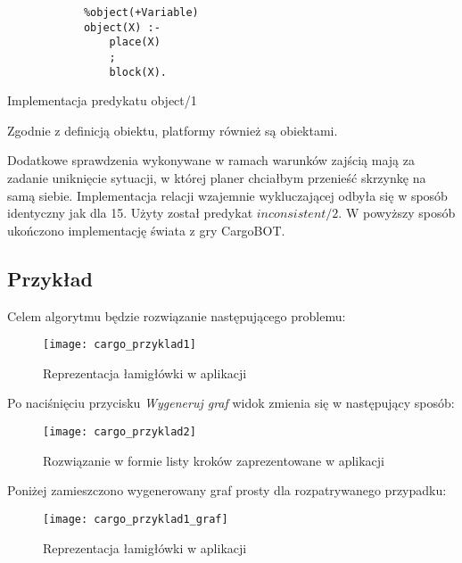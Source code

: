    \begin{listing}[H]
        \begin{verbatim}
            %object(+Variable)
            object(X) :-
                place(X)
                ;
                block(X).
        \end{verbatim}
    \caption{Implementacja predykatu object/1}
    \end{listing}

    Zgodnie z definicją obiektu, platformy również są obiektami.

    Dodatkowe sprawdzenia wykonywane w ramach warunków zajścią mają za zadanie uniknięcie sytuacji, w której planer chciałbym przenieść skrzynkę 
    na samą siebie.
    Implementacja relacji wzajemnie wykluczającej odbyła się w sposób identyczny jak dla 15. Użyty został predykat $inconsistent/2$.
    W powyższy sposób ukończono implementację świata z gry CargoBOT.

    \subsection{Przykład}  
    Celem algorytmu będzie rozwiązanie następującego problemu:
    \begin{figure}[H]
        \texttt{[image: cargo\_przyklad1]}
        \centering
        \caption{Reprezentacja łamigłówki w aplikacji}
        \label{CargoObrazek1}
    \end{figure}
    Po naciśnięciu przycisku \textit{Wygeneruj graf} widok zmienia się w następujący sposób:
    \begin{figure}[H]
        \texttt{[image: cargo\_przyklad2]}
        \centering
        \caption{Rozwiązanie w formie listy kroków zaprezentowane w aplikacji}
        \label{CargoObrazek2}
    \end{figure}
    Poniżej zamieszczono wygenerowany graf prosty dla rozpatrywanego przypadku:
    \begin{figure}[H]
        \texttt{[image: cargo\_przyklad1\_graf]}
        \centering
        \caption{Reprezentacja łamigłówki w aplikacji}
        \label{CargoObrazek3}
    \end{figure}


